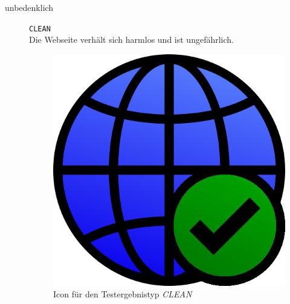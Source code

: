 \begin{description}
    \item[unbedenklich] \hfill \texttt{CLEAN} \\
    Die Webseite verhält sich harmlos und ist ungefährlich.
	\begin{figure}[H]
		\centering
		\includegraphics[scale=0.2]{images/webifier-clean}
		\caption{Icon für den Testergebnistyp \textit{CLEAN}}
	\end{figure}


\end{description}
